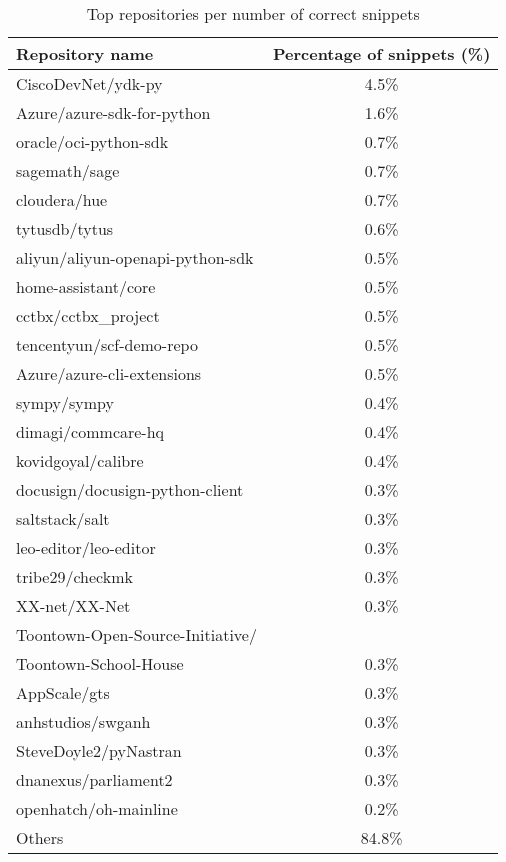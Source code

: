 \documentclass[10pt,conference]{IEEEtran}
\begin{document}
\begin{table}[htbp]
\caption{Top repositories per number of correct snippets}
\begin{center}
\renewcommand{\arraystretch}{1.2}
\begin{tabular}{| l | c |}
\hline
  \textbf{Repository name}  & \textbf{Percentage of snippets (\%)} \\
\hline
  CiscoDevNet/ydk-py & 4.5\color{lightgray}\% \\
\hline
  Azure/azure-sdk-for-python & 1.6\color{lightgray}\% \\
\hline
  oracle/oci-python-sdk  & 0.7\color{lightgray}\% \\
\hline
  sagemath/sage & 0.7\color{lightgray}\% \\
\hline
  cloudera/hue & 0.7\color{lightgray}\% \\
\hline
  tytusdb/tytus & 0.6\color{lightgray}\% \\
\hline
  aliyun/aliyun-openapi-python-sdk  &  0.5\color{lightgray}\% \\
\hline
  home-assistant/core &  0.5\color{lightgray}\% \\
\hline
  cctbx/cctbx\_project &  0.5\color{lightgray}\% \\
\hline
  tencentyun/scf-demo-repo &  0.5\color{lightgray}\% \\
\hline
  Azure/azure-cli-extensions &  0.5\color{lightgray}\% \\
\hline
  sympy/sympy &  0.4\color{lightgray}\% \\
\hline
  dimagi/commcare-hq  &  0.4\color{lightgray}\% \\
\hline
  kovidgoyal/calibre &  0.4\color{lightgray}\% \\
\hline
  docusign/docusign-python-client &  0.3\color{lightgray}\% \\
\hline
  saltstack/salt &  0.3\color{lightgray}\% \\
\hline
  leo-editor/leo-editor  &  0.3\color{lightgray}\% \\
\hline
   tribe29/checkmk &  0.3\color{lightgray}\% \\
\hline
  XX-net/XX-Net  &  0.3\color{lightgray}\% \\
\hline
  {Toontown-Open-Source-Initiative/}& \\{Toontown-School-House}  &  0.3\color{lightgray}\% \\
\hline
  AppScale/gts &  0.3\color{lightgray}\% \\
\hline
  anhstudios/swganh &  0.3\color{lightgray}\% \\
\hline
  SteveDoyle2/pyNastran &  0.3\color{lightgray}\% \\
\hline
  dnanexus/parliament2 &  0.3\color{lightgray}\% \\
\hline
  openhatch/oh-mainline &  0.2\color{lightgray}\% \\
\hline
  Others &  84.8\% \\
\hline
\end{tabular}
\label{tab5}
\end{center}
\end{table}
\end{document}

